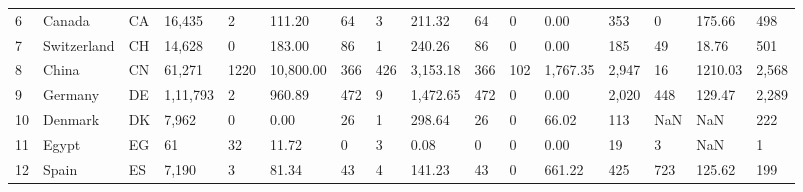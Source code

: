 \begin{tabular}{llllllllllllllll}
6  &              Canada &    CA      &               16,435 &               2 &                   111.20 &                        64 &               3 &                   211.32 &                        64 &               0 &                     0.00 &                       353 &                   0 &                   175.66 &                       498 \\
7  &         Switzerland &        CH  &               14,628 &               0 &                   183.00 &                        86 &               1 &                   240.26 &                        86 &               0 &                     0.00 &                       185 &                  49 &                    18.76 &                       501 \\
8  &               China &        CN  &               61,271 &            1220 &                10,800.00 &                       366 &             426 &                 3,153.18 &                       366 &             102 &                 1,767.35 &                     2,947 &                  16 &                  1210.03 &                     2,568 \\
9  &             Germany &        DE  &             1,11,793 &               2 &                   960.89 &                       472 &               9 &                 1,472.65 &                       472 &               0 &                     0.00 &                     2,020 &                 448 &                   129.47 &                     2,289 \\
10 &             Denmark &        DK  &                7,962 &               0 &                     0.00 &                        26 &               1 &                   298.64 &                        26 &               0 &                    66.02 &                       113 &                 NaN &                      NaN &                       222 \\
11 &               Egypt &        EG  &                   61 &              32 &                    11.72 &                         0 &               3 &                     0.08 &                         0 &               0 &                     0.00 &                        19 &                   3 &                      NaN &                         1 \\
12 &               Spain &   ES       &                7,190 &               3 &                    81.34 &                        43 &               4 &                   141.23 &                        43 &               0 &                   661.22 &                       425 &                 723 &                   125.62 &                       199 \\

\end{tabular}
